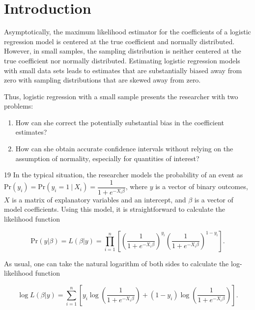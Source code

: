 \documentclass[12pt]{article}
\begin{document}

\section*{Introduction}

Asymptotically, the maximum likelihood estimator for the coefficients of a logistic regression model is centered at the true coefficient and normally distributed. However, in small samples, the sampling distribution is neither centered at the true coefficient nor normally distributed. Estimating logistic regression models with small data sets leads to estimates that are substantially biased away from zero with sampling distributions that are skewed away from zero. 

Thus, logistic regression with a small sample presents the researcher with two problems: 
\begin{enumerate}
\item How can she correct the potentially substantial bias in the coefficient estimates? 
\item How can she obtain accurate confidence intervals without relying on the assumption of normality, especially for quantities of interest?
\end{enumerate}
	19
In the typical situation, the researcher models the probability of an event as $\text{Pr}(y_i) = \text{Pr}(y_i = 1~|~ X_i) = \dfrac{1}{1 + e^{-X_i\beta}}$, where $y$ is a vector of binary outcomes, $X$ is a matrix of explanatory variables and an intercept, and $\beta$ is a vector of model coefficients. Using this model, it is straightforward to calculate the likelihood function 

\begin{equation}\nonumber
\text{Pr}(y | \beta) = L(\beta | y) = \displaystyle \prod_{i = 1}^n \left[\left( \dfrac{1}{1 + e^{-X_i\beta}}\right)^{y_i}\left( \dfrac{1}{1 + e^{-X_i\beta}}\right)^{1 - y_i}\right]\text{.}
\end{equation}

\noindent As usual, one can take the natural logarithm of both sides to calculate the log-likelihood function 

\begin{equation}\nonumber
\log L(\beta | y) = \displaystyle \sum_{i = 1}^n \left[y_i \log \left( \dfrac{1}{1 + e^{-X_i\beta}}\right) + (1 - y_i) \log \left( \dfrac{1}{1 + e^{-X_i\beta}}\right)\right].
\end{equation}
\end{document}
